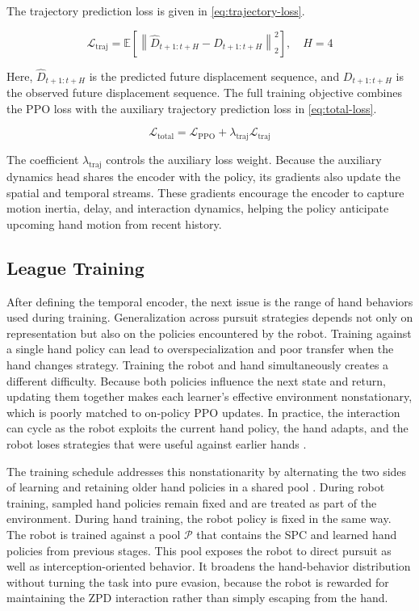 \documentclass[journal,twoside,web]{ieeecolor2}
\begin{document}
The trajectory prediction loss is given in \eqref{eq:trajectory-loss}.

\begin{equation}
\mathcal{L}_{\mathrm{traj}}
= \mathbb{E}\!\left[
\left\|\widehat{D}_{t+1:t+H}-D_{t+1:t+H}\right\|_2^2
\right], \quad H=4
\label{eq:trajectory-loss}
\end{equation}

Here, $\widehat{D}_{t+1:t+H}$ is the predicted future displacement sequence, and $D_{t+1:t+H}$ is the observed future displacement sequence. The full training objective combines the PPO loss with the auxiliary trajectory prediction loss in \eqref{eq:total-loss}.

\begin{equation}
\mathcal{L}_{\mathrm{total}} = \mathcal{L}_{\mathrm{PPO}} + \lambda_{\mathrm{traj}}\mathcal{L}_{\mathrm{traj}}
\label{eq:total-loss}
\end{equation}

The coefficient $\lambda_{\mathrm{traj}}$ controls the auxiliary loss weight. Because the auxiliary dynamics head shares the encoder with the policy, its gradients also update the spatial and temporal streams. These gradients encourage the encoder to capture motion inertia, delay, and interaction dynamics, helping the policy anticipate upcoming hand motion from recent history.

\subsection{League Training}
\label{subsec:league-training}
After defining the temporal encoder, the next issue is the range of hand behaviors used during training. Generalization across pursuit strategies depends not only on representation but also on the policies encountered by the robot. Training against a single hand policy can lead to overspecialization and poor transfer when the hand changes strategy. Training the robot and hand simultaneously creates a different difficulty. Because both policies influence the next state and return, updating them together makes each learner's effective environment nonstationary, which is poorly matched to on-policy PPO updates. In practice, the interaction can cycle as the robot exploits the current hand policy, the hand adapts, and the robot loses strategies that were useful against earlier hands \cite{lanctotUnifiedMARL2017}.

The training schedule addresses this nonstationarity by alternating the two sides of learning and retaining older hand policies in a shared pool \cite{vinyalsAlphaStar2019,jaderbergPopulationGames2019}. During robot training, sampled hand policies remain fixed and are treated as part of the environment. During hand training, the robot policy is fixed in the same way. The robot is trained against a pool $\mathcal{P}$ that contains the SPC and learned hand policies from previous stages. This pool exposes the robot to direct pursuit as well as interception-oriented behavior. It broadens the hand-behavior distribution without turning the task into pure evasion, because the robot is rewarded for maintaining the ZPD interaction rather than simply escaping from the hand.
\end{document}
